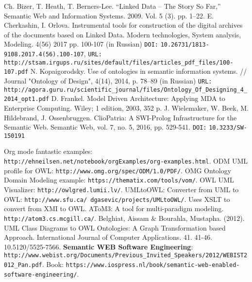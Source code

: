 \documentclass[conference,a4paper]{IEEEtran}
\providecommand\url[1]{\texttt{#1}}
\begin{document}
\begin{thebibliography}{11}
 Ch. Bizer, T. Heath, T. Berners-Lee. ``Linked Data – The Story So Far,'' Semantic Web and Information Systems. 2009. Vol. 5 (3). pp. 1–22.
 E. Cherkashin, I. Orlova. Instrumental tools for construction of the digital archives of the documents based on Linked Data. Modern technologies, System analysis, Modeling. 4(56) 2017 pp. 100-107 (in Russian) \texttt{DOI:} \url{10.26731/1813-9108.2017.4(56).100-107}, \texttt{URL:} \url{http://stsam.irgups.ru/sites/default/files/articles\_pdf\_files/100-107.pdf}
 N. Kopaigorodsky. Use of ontologies in semantic information systems. // Journal "Ontology of Design", 4(14), 2014, p. 78--89 (in Russian) \texttt{URL:} \url{http://agora.guru.ru/scientific\_journal/files/Ontology\_Of\_Designing\_4\_2014\_opt1.pdf}
 D. Frankel. Model Driven Architecture: Applying MDA to Enterprise Computing. Wiley; 1 edition, 2003, 352 p.
  J. Wielemaker, W. Beek, M. Hildebrand, J. Ossenbruggen. ClioPatria: A SWI-Prolog Infrastructure for the Semantic Web. Semantic Web, vol. 7, no. 5, 2016, pp. 529-541. \texttt{DOI:} \url{10.3233/SW-150191}

 Org mode fantastic examples: \url{http://ehneilsen.net/notebook/orgExamples/org-examples.html}.
 ODM UML profile for OWL: \url{http://www.omg.org/spec/ODM/1.0/PDF/}.
 OMG Ontology Domain Modeling example: \url{https://thematix.com/tools/vom/}.
 OWL UML Visualizer: \url{http://owlgred.lumii.lv/}.
 UMLtoOWL: Converter from UML to OWL: \url{http://www.sfu.ca/~dgasevic/projects/UMLtoOWL/}. Uses XSLT to convert from XMI to OWL.
 AToM3: A tool for multi-paradigm modeling. \url{http://atom3.cs.mcgill.ca/}.
 Belghiat, Aissam \& Bourahla, Mustapha. (2012). UML Class Diagrams to OWL Ontologies: A Graph Transformation based Approach. International Journal of Computer Applications. 41. 41-46. 10.5120/5525-7566.
 \textbf{Semantic WEB Software Engineering}: \url{http://www.webist.org/Documents/Previous\_Invited\_Speakers/2012/WEBIST2012\_Pan.pdf}. Book: \url{https://www.iospress.nl/book/semantic-web-enabled-software-engineering/}.
\end{thebibliography}




\end{document}

